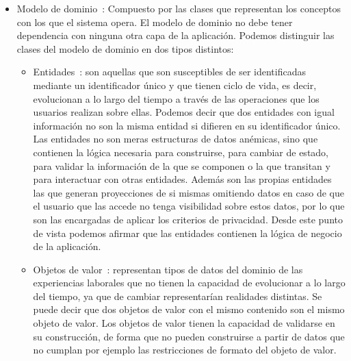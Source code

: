\documentclass[a4paper, 12pt]{book}
\begin{document}
    \begin{itemize}
        \item Modelo de dominio~\cite{bib:domainmodel}: Compuesto por las clases que representan los conceptos con los que el sistema opera.
        El modelo de dominio no debe tener dependencia con ninguna otra capa de la aplicación.
        Podemos distinguir las clases del modelo de dominio en dos tipos distintos:

        \begin{itemize}
            \item Entidades~\cite{bib:entities}: son aquellas que son susceptibles de ser identificadas mediante un identificador único y que tienen ciclo de vida, es decir, evolucionan a lo largo del tiempo a través de las operaciones que los usuarios realizan sobre ellas.
            Podemos decir que dos entidades con igual información no son la misma entidad si difieren en su identificador único.
            Las entidades no son meras estructuras de datos anémicas, sino que contienen la lógica necesaria para construirse, para cambiar de estado, para validar la información de la que se componen o la que transitan y para interactuar con otras entidades.
            Además son las propias entidades las que generan proyecciones de si mismas omitiendo datos en caso de que el usuario que las accede no tenga visibilidad sobre estos datos, por lo que son las encargadas de aplicar los criterios de privacidad.
            Desde este punto de vista podemos afirmar que las entidades contienen la lógica de negocio de la aplicación.
            \item Objetos de valor~\cite{bib:valueobjects}: representan tipos de datos del dominio de las experiencias laborales que no tienen la capacidad de evolucionar a lo largo del tiempo, ya que de cambiar representarían realidades distintas. Se puede decir que dos objetos de valor con el mismo contenido son el mismo objeto de valor.
            Los objetos de valor tienen la capacidad de validarse en su construcción, de forma que no pueden construirse a partir de datos que no cumplan por ejemplo las restricciones de formato del objeto de valor.
        \end{itemize}


\end{itemize}
\end{document}
